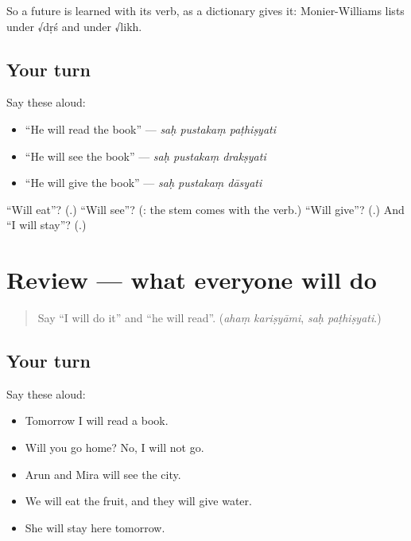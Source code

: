 So a future is learned with its verb, as a dictionary gives it: Monier-Williams lists \textbf{} under √dṛś and \textbf{} under √likh.

\subsection*{Your turn}
Say these aloud:

\begin{itemize}
\raggedright
  \item \textquotedblleft{}He will read the book\textquotedblright{} — \emph{saḥ pustakaṃ paṭhiṣyati}
  \item \textquotedblleft{}He will see the book\textquotedblright{} — \emph{saḥ pustakaṃ drakṣyati}
  \item \textquotedblleft{}He will give the book\textquotedblright{} — \emph{saḥ pustakaṃ dāsyati}
\end{itemize}

\begin{tcolorbox}[breakable,colback=teal!4,colframe=teal!35!black,title={Before you move on}]
\textquotedblleft{}Will eat\textquotedblright{}? (\textbf{}.) \textquotedblleft{}Will see\textquotedblright{}? (\textbf{}: the stem comes with the verb.) \textquotedblleft{}Will give\textquotedblright{}? (\textbf{}.) And \textquotedblleft{}I will stay\textquotedblright{}? (\textbf{}.)
\end{tcolorbox}
\section[(review)]{Review — what everyone will do}

\label{lesson:SA-R275-what-everyone-will-do}



\begin{quote}
Say \textquotedblleft{}I will do it\textquotedblright{} and \textquotedblleft{}he will read\textquotedblright{}. (\emph{ahaṃ kariṣyāmi}, \emph{saḥ paṭhiṣyati}.)
\end{quote}

\subsection*{Your turn}
Say these aloud:

\begin{itemize}
\raggedright
  \item Tomorrow I will read a book.
  \item Will you go home? No, I will not go.
  \item Arun and Mira will see the city.
  \item We will eat the fruit, and they will give water.
  \item She will stay here tomorrow.
\end{itemize}

